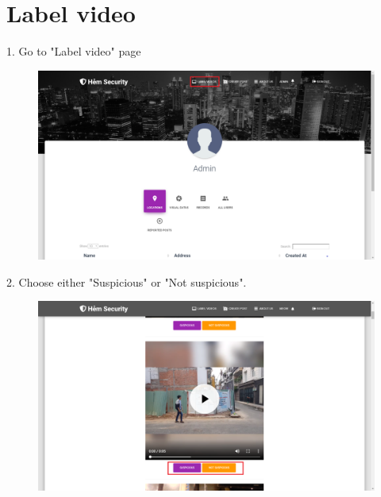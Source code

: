 \section{Label video}
1. Go to "Label video" page
\begin{center}
	\begin{figure}[H]
		\centering
		\includegraphics[width=1\columnwidth]{images/chap6/instruction5.png}
	\end{figure}
\end{center}
2. Choose either "Suspicious" or "Not suspicious". 
\begin{center}
	\begin{figure}[H]
		\centering
		\includegraphics[width=1\columnwidth]{images/chap6/instruction6.png}
	\end{figure}
\end{center}
